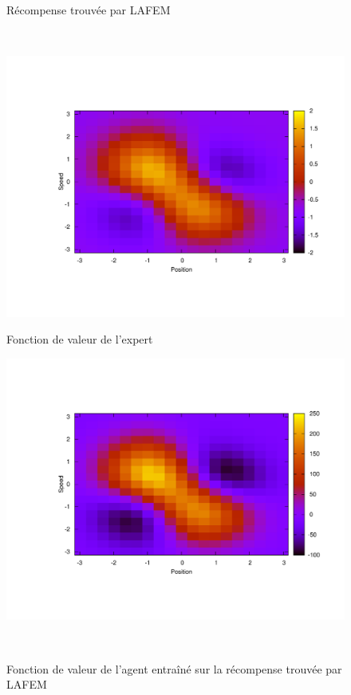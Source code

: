 \documentclass[publibook-draft]{CAp2012}
\begin{document}
\begin{figure}
\begin{minipage}[t]{.4\linewidth}
\begin{center}
       \caption{Récompense trouvée par LAFEM}
       \label{lafemR.fig}
    \end{center}
\end{minipage}\\
\begin{minipage}[t]{.4\linewidth}
    \begin{center}
       \includegraphics[width=\textwidth]{LAFEM_Exp3_Vexpert.pdf}
       \caption{Fonction de valeur de l'expert}
       \label{trueV.fig}
    \end{center}
\end{minipage}
\hfill
\begin{minipage}[t]{.4\linewidth}
    \begin{center}
       \includegraphics[width=\textwidth]{LAFEM_Exp3_Vagent.pdf}
       \caption{Fonction de valeur de l'agent entraîné sur la récompense trouvée par LAFEM}
       \label{lafemV.fig}
    \end{center}
\end{minipage}\\
\end{figure}
\end{document}
